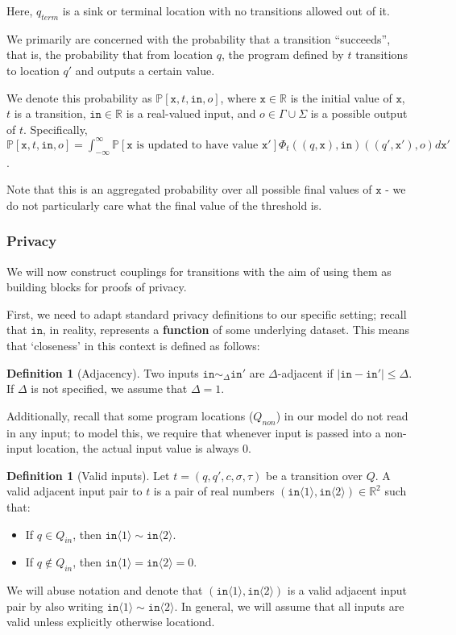 \documentclass[12pt]{article}
\newcommand{\RR}{\mathbb{R}}
\newcommand{\PP}{\mathbb{P}}
\newcommand{\brangle}[1]{\langle#1 \rangle}
\theoremstyle{definition}
\newtheorem{defn}[thm]{Definition}
\begin{document}
Here, $q_{term}$ is a sink or terminal location with no transitions allowed out of it.

We primarily are concerned with the probability that a transition ``succeeds'', that is, the probability that from location $q$, the program defined by $t$ transitions to location $q'$ and outputs a certain value. 

We denote this probability as $\PP[\texttt{x}, t, \texttt{in}, o]$, where $\texttt{x} \in \RR$ is the initial value of $\texttt{x}$, $t$ is a transition, $\texttt{in}\in \RR$ is a real-valued input, and $o\in \Gamma\cup\Sigma$ is a possible output of $t$. Specifically, $\PP[\texttt{x}, t, \texttt{in}, o] = \int_{-\infty}^\infty\PP[\texttt{x}\text{ is updated to have value }\texttt{x}']\Phi_t((q, \texttt{x}), \texttt{in})((q', \texttt{x}'), o)d\texttt{x}'$.

Note that this is an aggregated probability over all possible final values of $\texttt{x}$ - we do not particularly care what the final value of the threshold is. 

\subsubsection{Privacy}

We will now construct couplings for transitions with the aim of using them as building blocks for proofs of privacy. 

First, we need to adapt standard privacy definitions to our specific setting; recall that $\texttt{in}$, in reality, represents a \textbf{function} of some underlying dataset. This means that `closeness' in this context is defined as follows:


\begin{defn}[Adjacency]
    Two inputs $\texttt{in}\sim_{\Delta} \texttt{in}'$ are $\Delta$-adjacent if $|\texttt{in}-\texttt{in}'|\leq \Delta$. If $\Delta$ is not specified, we assume that $\Delta = 1$. 
\end{defn}

Additionally, recall that some program locations ($Q_{non}$) in our model do not read in any input; to model this, we require that whenever input is passed into a non-input location, the actual input value is always 0.

\begin{defn}[Valid inputs]
    Let $t = (q, q', c, \sigma, \tau)$ be a transition over $Q$. A valid adjacent input pair to $t$ is a pair of real numbers $(\texttt{in}\brangle{1}, \texttt{in}\brangle{2})\in \RR^2$ such that:
    \begin{itemize}
        \item If $q\in Q_{in}$, then $\texttt{in}\brangle{1}\sim \texttt{in}\brangle{2}$. 
        \item If $q\notin Q_{in}$, then $\texttt{in}\brangle{1} = \texttt{in}\brangle{2} = 0$.
    \end{itemize}
    We will abuse notation and denote that $(\texttt{in}\brangle{1}, \texttt{in}\brangle{2})$ is a valid adjacent input pair by also writing $\texttt{in}\brangle{1}\sim\texttt{in}\brangle{2}$. In general, we will assume that all inputs are valid unless explicitly otherwise locationd.
\end{defn}
\end{document}
